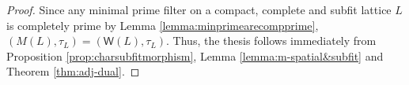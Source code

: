 \documentclass{article}
\newcommand{\corn}[1]{(\mathsf{W}(#1),\tau_{#1})}
\theoremstyle{plain}
\newtheorem{question}[theorem]{Question}
\theoremstyle{definition}
\theoremstyle{remark}
\newcommand{\bool}[1]{\mathsf{#1}}
\newcommand{\0}{\mathbbm 0}
\newcommand{\1}{\mathbbm 1}
\newcommand{\2}{\mathbbm 2}
\begin{document}
\begin{proof}
Since any minimal prime filter on a compact, complete and subfit lattice \(L\) is completely prime by Lemma \ref{lemma:minprimearecompprime}, \((M(L), \tau_L) = \corn{L}\). Thus, the thesis follows immediately from Proposition \ref{prop:charsubfitmorphism}, Lemma \ref{lemma:m-spatial&subfit} and Theorem \ref{thm:adj-dual}. 
\end{proof}






 




\end{document}
